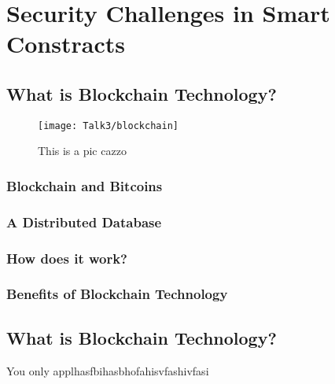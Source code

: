 \chapter{Security Challenges in Smart Constracts}


\newpage

\minitoc %

\newpage

\section{What is Blockchain Technology?}
       \begin{figure}[ht]
         \begin{center}
         \texttt{[image: Talk3/blockchain]}
         \end{center}
         \caption{This is a pic cazzo}
         \label{label}
       \end{figure}
       
\subsection{Blockchain and Bitcoins}
\subsection{A Distributed Database}
\subsection{How does it work?}

\subsection{Benefits of Blockchain Technology}
\section{What is Blockchain Technology?}

You only applhasfbihasbhofahisvfashivfasi
